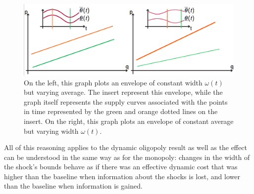 
\begin{figure}[h] 
\centering
\includegraphics[width=15cm]{figch1/uncertainty.png}
\caption{\small{On the left, this graph plots an envelope of constant width $\omega(t)$ but varying average. The insert represent this envelope, while the graph itself represents the supply curves associated with the points in time represented by the green and orange dotted lines on the insert. On the right, this graph plots an envelope of constant average but varying width $\omega(t)$. }} \label{figdyn1}
\end{figure}

All of this reasoning applies to the dynamic oligopoly result as well as the effect can be understood in the same way as for the monopoly: changes in the width of the shock's bounds behave as if there was an effective dynamic cost that was higher than the baseline when information about the shocks is lost, and lower than the baseline when information is gained.

